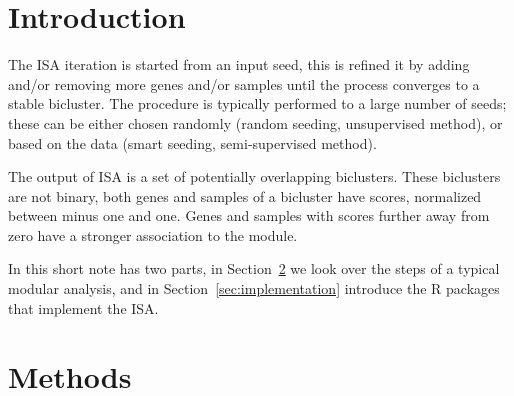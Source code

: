 \documentclass{bioinfo}
\begin{document}
\section{Introduction}


The ISA iteration is started from an input seed, this is 
refined it by adding and/or removing more genes and/or
samples until the process converges to a stable bicluster. The
procedure is typically performed to a large number of seeds; these can
be either chosen randomly (random seeding, unsupervised method), or
based on the data (smart seeding, semi-supervised method).

The output of ISA is a set of potentially overlapping
biclusters. These biclusters are not binary, both genes and samples of
a bicluster have scores, normalized between minus one and one. Genes
and samples with scores further away from zero have a stronger
association to the module.

In this short note has two parts, in Section~\ref{sec:methods} we look
over the steps of a typical modular analysis, and in
Section~\ref{sec:implementation} introduce the R packages that
implement the ISA.

\section{Methods}%
\label{sec:methods}
\end{document}
